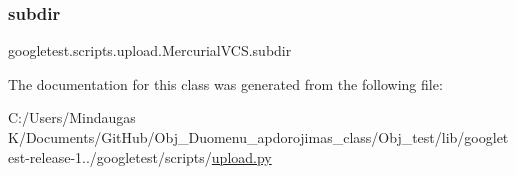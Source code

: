\subsubsection{\texorpdfstring{subdir}{subdir}}
{\footnotesize\ttfamily googletest.\+scripts.\+upload.\+Mercurial\+V\+C\+S.\+subdir}



The documentation for this class was generated from the following file\+:\begin{DoxyCompactItemize}
\item 
C\+:/\+Users/\+Mindaugas K/\+Documents/\+Git\+Hub/\+Obj\+\_\+\+Duomenu\+\_\+apdorojimas\+\_\+class/\+Obj\+\_\+test/lib/googletest-\/release-\/1../googletest/scripts/\mbox{\hyperlink{_obj__test_2lib_2googletest-release-1_88_81_2googletest_2scripts_2upload_8py}{upload.\+py}}\end{DoxyCompactItemize}
